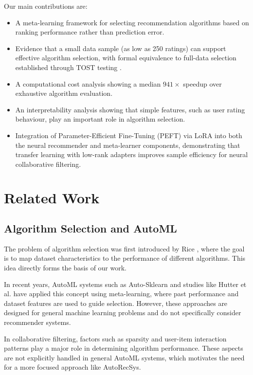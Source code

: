 \documentclass[conference]{IEEEtran}
\begin{document}
Our main contributions are:
\begin{itemize}
    \item A meta-learning framework for selecting recommendation algorithms based on ranking performance rather than prediction error.
    \item Evidence that a small data sample (as low as 250 ratings) can support effective algorithm selection, with formal equivalence to full-data selection established through TOST testing \cite{schuirmann1987tost}.
    \item A computational cost analysis showing a median $941\times$ speedup over exhaustive algorithm evaluation.
    \item An interpretability analysis showing that simple features, such as user rating behaviour, play an important role in algorithm selection.
    \item Integration of Parameter-Efficient Fine-Tuning (PEFT) via LoRA \cite{hu2022lora} into both the neural recommender and meta-learner components, demonstrating that transfer learning with low-rank adapters improves sample efficiency for neural collaborative filtering.
\end{itemize}

\section{Related Work}

\subsection{Algorithm Selection and AutoML}

The problem of algorithm selection was first introduced by Rice \cite{rice1976algorithm}, where the goal is to map dataset characteristics to the performance of different algorithms. This idea directly forms the basis of our work.

In recent years, AutoML systems such as Auto-Sklearn \cite{feurer2015autosklearn} and studies like Hutter et al. \cite{hutter2019automl} have applied this concept using meta-learning, where past performance and dataset features are used to guide selection. However, these approaches are designed for general machine learning problems and do not specifically consider recommender systems.

In collaborative filtering, factors such as sparsity and user-item interaction patterns play a major role in determining algorithm performance. These aspects are not explicitly handled in general AutoML systems, which motivates the need for a more focused approach like AutoRecSys.
\end{document}
